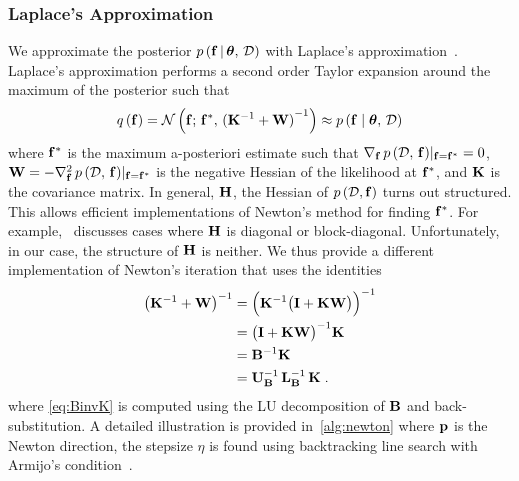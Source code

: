\subsubsection{Laplace's Approximation}
We approximate the posterior \(p\,(\mathbf{f}\,|\,\bm{\theta},\, \mathcal{D})\) with Laplace's approximation~\cite{williams_bayesian_1998}.
Laplace's approximation performs a second order Taylor expansion around the maximum of the posterior such that
\begin{align}
q\,(\mathbf{f}) = \mathcal{N}\left(\mathbf{f};\, \mathbf{f}^*,\, {(\mathbf{K}^{-1} + \mathbf{W})}^{-1}\right) \approx p\,(\mathbf{f} \mid \bm{\theta},\, \mathcal{D})
\end{align}
where \(\mathbf{f}^*\) is the maximum a-posteriori estimate such that \(\nabla_{\mathbf{f}}\, p\,(\mathcal{D},\, \mathbf{f})|_{\mathbf{f} = \mathbf{f}^*} = 0\), \(\mathbf{W} = -\nabla^2_{\mathbf{f}}\, p\,(\mathcal{D},\,\mathbf{f})|_{\mathbf{f}=\mathbf{f}^*} \) is the negative Hessian of the likelihood at \(\mathbf{f}^*\), and \(\mathbf{K}\) is the covariance matrix.
In general, \(\mathbf{H}\), the Hessian of \(p\,(\mathcal{D},\mathbf{f})\) turns out structured.
This allows efficient implementations of Newton's method for finding \(\mathbf{f}^*\).
For example,~\cite{rasmussen_gaussian_2006} discusses cases where \(\mathbf{H}\) is diagonal or block-diagonal.
Unfortunately, in our case, the structure of \(\mathbf{H}\) is neither.
We thus provide a different implementation of Newton's iteration that uses the identities
\begin{align}
  {\big(\mathbf{K}^{-1} + \mathbf{W}\big)}^{-1}
  &= {\Big(\mathbf{K}^{-1} \big(\mathbf{I} + \mathbf{K} \mathbf{W} \big)\Big)}^{-1} \\
  &= {{\big(\mathbf{I} + \mathbf{K} \mathbf{W} \big)}^{-1} \mathbf{K}} \\
  &= \mathbf{B}^{-1} \mathbf{K} \\
  &= \mathbf{U}_{\mathbf{B}}^{-1} \, \mathbf{L}_{\mathbf{B}}^{-1} \, \mathbf{K} \label{eq:BinvK}
\;.
\end{align}
where \cref{eq:BinvK} is computed using the LU decomposition of \(\mathbf{B}\) and back-substitution.
A detailed illustration is provided in~\cref{alg:newton} where \(\mathbf{p}\) is the Newton direction, the stepsize \(\eta\) is found using backtracking line search with Armijo's condition~\cite{nocedal_numerical_2006}.

